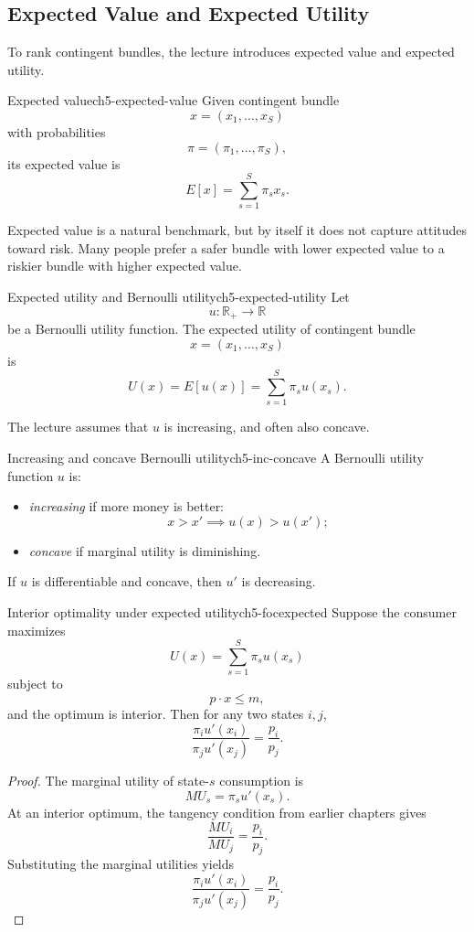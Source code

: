 \subsection{Expected Value and Expected Utility}

To rank contingent bundles, the lecture introduces expected value and expected utility.

\begin{definition}{Expected value}{ch5-expected-value}
Given contingent bundle
\[
x=(x_1,\dots,x_S)
\]
with probabilities
\[
\pi=(\pi_1,\dots,\pi_S),
\]
its expected value is
\[
E[x] = \sum_{s=1}^S \pi_s x_s.
\]
\end{definition}

Expected value is a natural benchmark, but by itself it does not capture attitudes toward risk. Many people prefer a safer bundle with lower expected value to a riskier bundle with higher expected value.

\begin{definition}{Expected utility and Bernoulli utility}{ch5-expected-utility}
Let
\[
u:\mathbb{R}_+ \to \mathbb{R}
\]
be a Bernoulli utility function. The expected utility of contingent bundle
\[
x=(x_1,\dots,x_S)
\]
is
\[
U(x)=E[u(x)] = \sum_{s=1}^S \pi_s u(x_s).
\]
\end{definition}

The lecture assumes that $u$ is increasing, and often also concave.

\begin{definition}{Increasing and concave Bernoulli utility}{ch5-inc-concave}
A Bernoulli utility function $u$ is:
\begin{itemize}
    \item \emph{increasing} if more money is better:
    \[
    x>x' \implies u(x)>u(x');
    \]
    \item \emph{concave} if marginal utility is diminishing.
\end{itemize}
If $u$ is differentiable and concave, then $u'$ is decreasing.
\end{definition}

\begin{theorem}{Interior optimality under expected utility}{ch5-focexpected}
Suppose the consumer maximizes
\[
U(x)=\sum_{s=1}^S \pi_s u(x_s)
\]
subject to
\[
p\cdot x \le m,
\]
and the optimum is interior. Then for any two states $i,j$,
\[
\frac{\pi_i u'(x_i)}{\pi_j u'(x_j)} = \frac{p_i}{p_j}.
\]
\end{theorem}

\begin{proof}
The marginal utility of state-$s$ consumption is
\[
MU_s = \pi_s u'(x_s).
\]
At an interior optimum, the tangency condition from earlier chapters gives
\[
\frac{MU_i}{MU_j} = \frac{p_i}{p_j}.
\]
Substituting the marginal utilities yields
\[
\frac{\pi_i u'(x_i)}{\pi_j u'(x_j)} = \frac{p_i}{p_j}.
\]
\end{proof}

